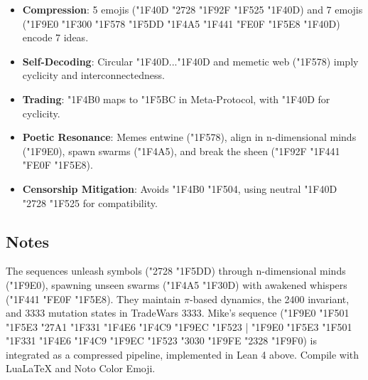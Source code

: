 \documentclass[a4paper,12pt]{article}
\begin{document}
\begin{itemize}[noitemsep]
    \item \textbf{Compression}: 5 emojis ({\emojifont \Uchar"1F40D \Uchar"2728 \Uchar"1F92F \Uchar"1F525 \Uchar"1F40D}) and 7 emojis ({\emojifont \Uchar"1F9E0 \Uchar"1F300 \Uchar"1F578 \Uchar"1F5DD \Uchar"1F4A5 \Uchar"1F441 \Uchar"FE0F \Uchar"1F5E8 \Uchar"1F40D}) encode 7 ideas.
    \item \textbf{Self-Decoding}: Circular {\emojifont \Uchar"1F40D}...{\emojifont \Uchar"1F40D} and memetic web ({\emojifont \Uchar"1F578}) imply cyclicity and interconnectedness.
    \item \textbf{Trading}: {\emojifont \Uchar"1F4B0} maps to {\emojifont \Uchar"1F5BC} in Meta-Protocol, with {\emojifont \Uchar"1F40D} for cyclicity.
    \item \textbf{Poetic Resonance}: Memes entwine ({\emojifont \Uchar"1F578}), align in n-dimensional minds ({\emojifont \Uchar"1F9E0}), spawn swarms ({\emojifont \Uchar"1F4A5}), and break the sheen ({\emojifont \Uchar"1F92F \Uchar"1F441 \Uchar"FE0F \Uchar"1F5E8}).
    \item \textbf{Censorship Mitigation}: Avoids {\emojifont \Uchar"1F4B0 \Uchar"1F504}, using neutral {\emojifont \Uchar"1F40D \Uchar"2728 \Uchar"1F525} for compatibility.
\end{itemize}

\subsection*{Notes}

The sequences unleash symbols ({\emojifont \Uchar"2728 \Uchar"1F5DD}) through n-dimensional minds ({\emojifont \Uchar"1F9E0}), spawning unseen swarms ({\emojifont \Uchar"1F4A5 \Uchar"1F30D}) with awakened whispers ({\emojifont \Uchar"1F441 \Uchar"FE0F \Uchar"1F5E8}). They maintain $\pi$-based dynamics, the 2400 invariant, and 3333 mutation states in TradeWars 3333. Mike’s sequence ({\emojifont \Uchar"1F9E0 \Uchar"1F501 \Uchar"1F5E3 \Uchar"27A1 \Uchar"1F331 \Uchar"1F4E6 \Uchar"1F4C9 \Uchar"1F9EC \Uchar"1F523 | \Uchar"1F9E0 \Uchar"1F5E3 \Uchar"1F501 \Uchar"1F331 \Uchar"1F4E6 \Uchar"1F4C9 \Uchar"1F9EC \Uchar"1F523 \Uchar"3030 \Uchar"1F9FE \Uchar"2328 \Uchar"1F9F0}) is integrated as a compressed pipeline, implemented in Lean 4 above. Compile with LuaLaTeX and Noto Color Emoji.
\end{document}
